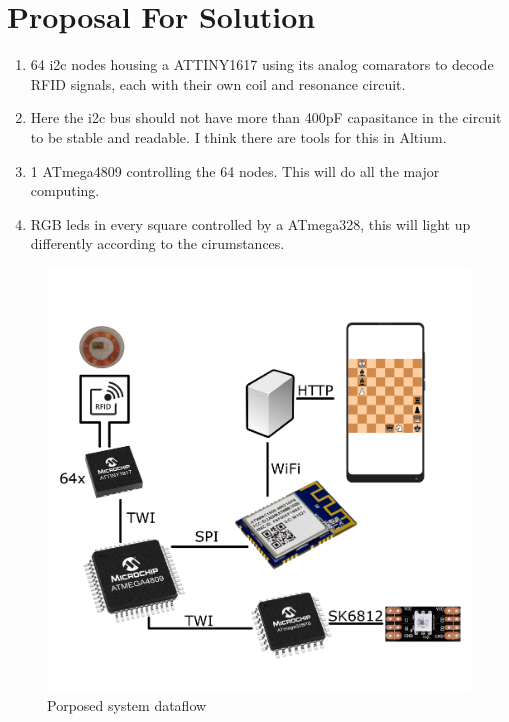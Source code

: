 \chapter{Proposal For Solution}
\label{proposedSolution}
\begin{enumerate}
    \item 64 i2c nodes housing a ATTINY1617 using its analog comarators to decode RFID signals, each with their own coil and resonance circuit.
    \item Here the i2c bus should not have more than 400pF capasitance in the circuit to be stable and readable. I think there are tools for this in Altium.
    \item 1 ATmega4809 controlling the 64 nodes. This will do all the major computing.
    \item RGB leds in every square controlled by a ATmega328, this will light up differently according to the cirumstances.
\end{enumerate}

\begin{figure}[]
    \centering
    \includegraphics[width=\textwidth]{04_My_Proposal_For_Solution/figures/system_overview.png}
    \caption{Porposed system dataflow}
    \label{fig:04:Dataflow}
\end{figure}
